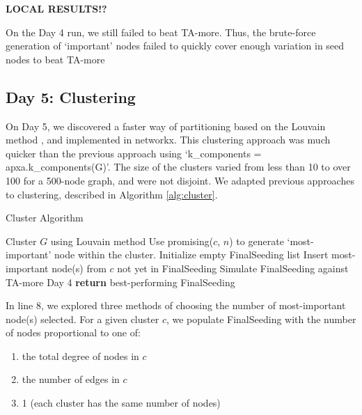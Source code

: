 \documentclass[letterpaper, 11pt]{article}
\begin{document}
\textbf{LOCAL RESULTS!?}

On the Day 4 run, we still failed to beat TA-more. Thus, the brute-force generation of `important' nodes failed to quickly cover enough variation in seed nodes to beat TA-more



\subsection{Day 5: Clustering}
On Day 5, we discovered a faster way of partitioning based on the Louvain method \cite{louvain}, and implemented in networkx. This clustering approach was much quicker than the previous approach using ‘k\_components = apxa.k\_components(G)’. The size of the clusters varied from less than 10 to over 100 for a 500-node graph, and were not disjoint. We adapted previous approaches to clustering, described in Algorithm \ref{alg:cluster}.


\begin{algorithm}
\caption{Cluster Algorithm}
\begin{algorithmic}[1]
\State Cluster $G$ using Louvain method
\State Use promising($c$, $n$) to generate `most-important' node within the cluster.
\EndFor
{}
\State Initialize empty FinalSeeding list
\State Insert most-important node(s) from $c$ not yet in FinalSeeding
\EndFor
\State Simulate FinalSeeding against TA-more Day 4
\EndWhile
\EndFor
\State \textbf{return} best-performing FinalSeeding
\EndProcedure
\end{algorithmic}
\label{alg:cluster}
\end{algorithm}

In line 8, we explored three methods of choosing the number of most-important node(s) selected. For a given cluster $c$, we populate FinalSeeding with the number of nodes proportional to one of:
\begin{enumerate}[label=(\arabic*)]
\item the total degree of nodes in $c$
\item the number of edges in $c$
\item 1 (each cluster has the same number of nodes)
\end{enumerate}
\end{document}
